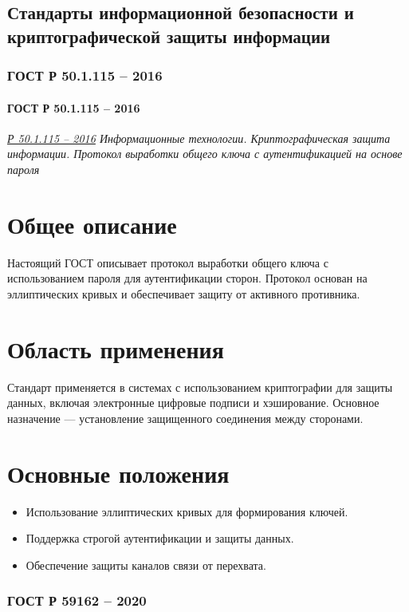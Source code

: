 \subsection{Стандарты информационной безопасности и криптографической защиты информации}

\subsubsection{ГОСТ Р 50.1.115 -- 2016}
\paragraph{ГОСТ Р 50.1.115 -- 2016}
\emph{\href{https://rst.gov.ru:8443/file-service/file/load/1699435168541}{Р 50.1.115 -- 2016}
Информационные технологии.
Криптографическая защита информации.
Протокол выработки общего ключа с аутентификацией на основе пароля}

\section*{Общее описание}
Настоящий ГОСТ описывает протокол выработки общего ключа с использованием пароля для аутентификации сторон. Протокол основан на эллиптических кривых и обеспечивает защиту от активного противника.

\section*{Область применения}
Стандарт применяется в системах с использованием криптографии для защиты данных, включая электронные цифровые подписи и хэширование. Основное назначение — установление защищенного соединения между сторонами.

\section*{Основные положения}
\begin{itemize}
    \item Использование эллиптических кривых для формирования ключей.
    \item Поддержка строгой аутентификации и защиты данных.
    \item Обеспечение защиты каналов связи от перехвата.
\end{itemize}

\subsubsection{ГОСТ Р 59162 -- 2020}
